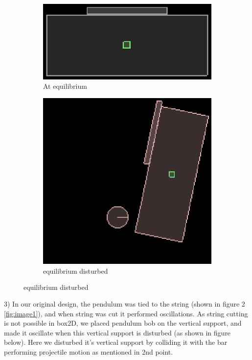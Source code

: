 \documentclass[a4paper,11pt]{article}
\begin{document}
{\begin{figure}[ht!]
\centering
\begin{subfigure}{.5\textwidth}
  \centering
  \includegraphics[width=.4\linewidth]{images/image5}
  \caption{At equilibrium}
  \label{fig:image5}
\end{subfigure}%
\begin{subfigure}{.5\textwidth}
  \centering
  \includegraphics[width=.4\linewidth]{images/image6}
  \caption{equilibrium disturbed}
  \label{fig:image6}
\end{subfigure}
\end{figure}

3) In our original design, the pendulum was tied to the string (shown in figure 2 \ref{fig:image1}), and when string was cut it performed oscillations. As string cutting is not possible in box2D, we placed pendulum bob on the vertical support, and made it oscillate when this vertical support is disturbed (as shown in figure below). Here we disturbed it's vertical support by colliding it with the bar performing projectile motion as mentioned in 2nd point.\\

}
\end{document}
